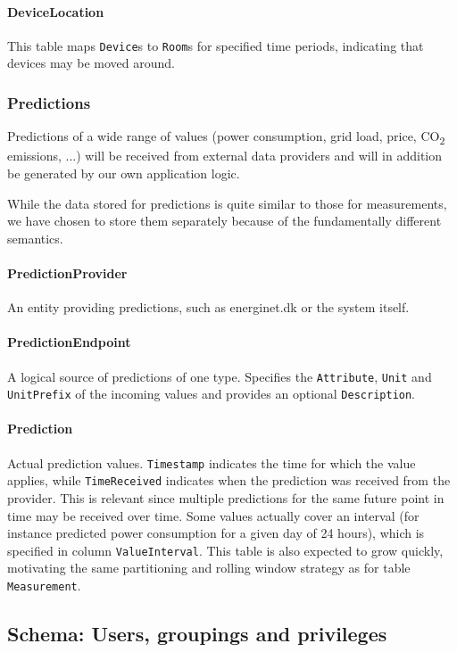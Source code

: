 \paragraph{DeviceLocation} This table maps \texttt{Device}s to \texttt{Room}s for specified time periods, indicating that devices may be moved around.

\subsubsection{Predictions}
Predictions of a wide range of values (power consumption, grid load, price, CO\textsubscript{2} emissions, ...) will be received from external data providers and will in addition be generated by our own application logic. 

While the data stored for predictions is quite similar to those for measurements, we have chosen to store them separately because of the fundamentally different semantics.

\paragraph{PredictionProvider}
An entity providing predictions, such as energinet.dk or the system itself.

\paragraph{PredictionEndpoint} 
A logical source of predictions of one type. Specifies the \texttt{Attribute}, \texttt{Unit} and \texttt{UnitPrefix} of the incoming values and provides an optional \texttt{Description}.

\paragraph{Prediction}
Actual prediction values. \texttt{Timestamp} indicates the time for which the value applies, while \texttt{TimeReceived} indicates when the prediction was received from the provider. This is relevant since multiple predictions for the same future point in time may be received over time. Some values actually cover an interval (for instance predicted power consumption for a given day of 24 hours), which is specified in column \texttt{ValueInterval}.
This table is also expected to grow quickly, motivating the same partitioning and rolling window strategy as for table \texttt{Measurement}.

\newpage
\subsection{Schema: Users, groupings and privileges}

